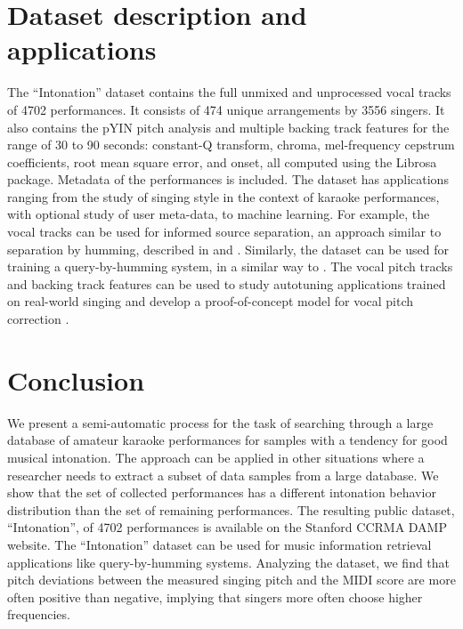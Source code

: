 \section{Dataset description and applications}
The ``Intonation'' dataset contains the full unmixed and unprocessed vocal tracks of 4702 performances. It consists of 474 unique arrangements by 3556 singers. It also contains the pYIN pitch analysis and multiple backing track features for the range of 30 to 90 seconds: constant-Q transform, chroma, mel-frequency cepstrum coefficients, root mean square error, and onset, all computed using the Librosa \cite{mcfee2015librosa} package. Metadata of the performances is included. The dataset has applications ranging from the study of singing style in the context of karaoke performances, with optional study of user meta-data, to machine learning. For example, the vocal tracks can be used for informed source separation, an approach similar to separation by humming, described in \cite{smaragdis2009separation} and \cite{liutkus2012informed}. Similarly, the dataset can be used for training a query-by-humming system, in a similar way to \cite{huq2010crowdsourcing}. The vocal pitch tracks and backing track features can be used to study autotuning applications trained on real-world singing and develop a proof-of-concept model for vocal pitch correction \cite{wager2018pitch}.

\section{Conclusion}
We present a semi-automatic process for the task of searching through a large database of amateur karaoke performances for samples with a tendency for good musical intonation. The approach can be applied in other situations where a researcher needs to extract a subset of data samples from a large database. We show that the set of collected performances has a different intonation behavior distribution than the set of remaining performances. The resulting public dataset, ``Intonation'', of 4702 performances is available on the Stanford CCRMA DAMP website. The ``Intonation'' dataset can be used for music information retrieval applications like query-by-humming systems. Analyzing the dataset, we find that pitch deviations between the measured singing pitch and the MIDI score are more often positive than negative, implying that singers more often choose higher frequencies.